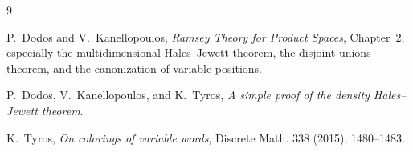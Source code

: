 \documentclass[11pt]{article}
\theoremstyle{remark}
\begin{document}
\begin{thebibliography}{9}

P.~Dodos and V.~Kanellopoulos,
\emph{Ramsey Theory for Product Spaces},
Chapter~2, especially the multidimensional Hales--Jewett theorem, the
disjoint-unions theorem, and the canonization of variable positions.

P.~Dodos, V.~Kanellopoulos, and K.~Tyros,
\emph{A simple proof of the density Hales--Jewett theorem}.

K.~Tyros,
\emph{On colorings of variable words},
Discrete Math. 338 (2015), 1480--1483.

\end{thebibliography}
\end{document}
